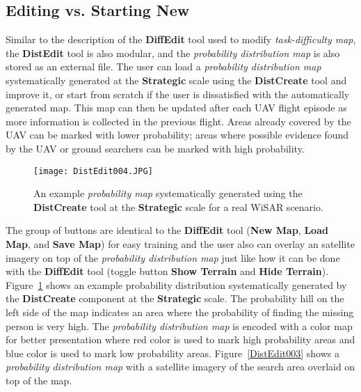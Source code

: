 \subsection{Editing vs. Starting New}

Similar to the description of the \textbf{DiffEdit} tool used to modify \textit{task-difficulty map}, the \textbf{DistEdit} tool is also modular, and the \textit{probability distribution map} is also stored as an external file. The user can load a \textit{probability distribution map} systematically generated at the \textbf{Strategic} scale using the \textbf{DistCreate} tool and improve it, or start from scratch if the user is dissatisfied with the automatically generated map. This map can then be updated after each UAV flight episode as more information is collected in the previous flight. Areas already covered by the UAV can be marked with lower probability; areas where possible evidence found by the UAV or ground searchers can be marked with high probability. 

\begin{figure}[!ht]
\centering
\texttt{[image: DistEdit004.JPG]}
\caption{An example \textit{probability map} systematically generated using the \textbf{DistCreate} tool at the \textbf{Strategic} scale for a real WiSAR scenario.}
\label{DistEdit004}
\end{figure}

The group of buttons are identical to the \textbf{DiffEdit} tool (\textbf{New Map}, \textbf{Load Map}, and \textbf{Save Map}) for easy training and the user also can overlay an satellite imagery on top of the \textit{probability distribution map} just like how it can be done with the \textbf{DiffEdit} tool (toggle button \textbf{Show Terrain} and \textbf{Hide Terrain}). Figure~\ref{DistEdit004} shows an example probability distribution systematically generated by the \textbf{DistCreate} component at the \textbf{Strategic} scale. The probability hill on the left side of the map indicates an area where the probability of finding the missing person is very high. The \textit{probability distribution map} is encoded with a color map for better presentation where red color is used to mark high probability areas and blue color is used to mark low probability areas. Figure~\ref{DistEdit003} shows a \textit{probability distribution map} with a satellite imagery of the search area overlaid on top of the map.

